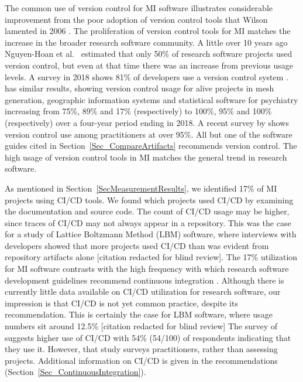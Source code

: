 \documentclass[final, 12pt, 3p, times]{elsarticle}
\begin{document}
The common use of version control for MI software illustrates considerable
improvement from the poor adoption of version control tools that Wilson lamented
in 2006 \cite{Wilson2006}.  The proliferation of version control tools for MI
matches the increase in the broader research software community.  A little over
10 years ago Nguyen-Hoan et al.\ \cite{Nguyen-HoanEtAl2010} estimated that only
50\% of research software projects used version control, but even at that time
there was an increase from previous usage levels. A survey in 2018 shows 81\% of
developers use a version control system \cite{AlNoamanyAndBorghi2018}.
\cite{Smith2018} has similar results, showing version control usage for alive
projects in mesh generation, geographic information systems and statistical
software for psychiatry increasing from 75\%, 89\% and 17\% (respectively) to
100\%, 95\% and 100\% (respectively) over a four-year period ending in 2018. A
recent survey by \cite{CarverEtAl2022} shows version control use among
practitioners at over 95\%. All but one of the software guides cited in
Section~\ref{Sec_CompareArtifacts} recommends version control. The high usage of
version control tools in MI matches the general trend in research software.

As mentioned in Section~\ref{SecMeasurementResults}, we identified 17\% of MI
projects using CI/CD tools. We found which projects used CI/CD by examining the
documentation and source code. The count of CI/CD usage may be higher, since
traces of CI/CD may not always appear in a repository.  This was the case for a
study of Lattice Boltzmann Method (LBM) software, where interviews with
developers showed that more projects used CI/CD than was evident from repository
artifacts alone [citation redacted for blind review].  %
The 17\% utilization for MI software contrasts with the high frequency with
which research software development guidelines recommend continuous integration
\cite{BrettEtAl2021, Brown2015, ThielEtAl2020, Zadka2018, vanGompelEtAl2016}.
Although there is currently little data available on CI/CD utilization for
research software, our impression is that CI/CD is not yet common practice,
despite its recommendation.  This is certainly the case for LBM software, where
usage numbers sit around 12.5\% [citation redacted for blind review]
The survey of \cite{CarverEtAl2022} suggests higher use of CI/CD with 54\%
(54/100) of respondents indicating that they use it. However, that study surveys
practitioners, rather than assessing projects.  Additional information on CI/CD
is given in the recommendations (Section~\ref{Sec_ContinuousIntegration}).
\end{document}

